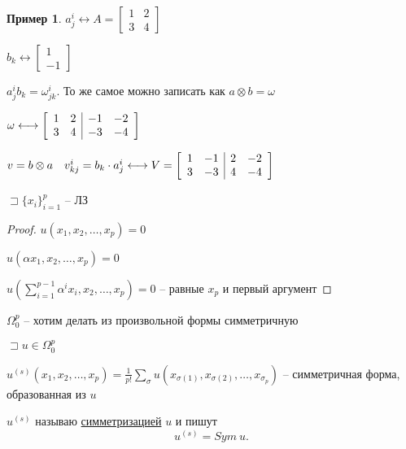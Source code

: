\documentclass{book}
\theoremstyle{definition}
\newtheorem*{example}{Пример}
\begin{document}
         \begin{example}
             $a^i_j \longleftrightarrow A = \begin{bmatrix} 1 & 2\\ 3 & 4 \end{bmatrix} $

             $b_k \longleftrightarrow \begin{bmatrix} 1\\-1 \end{bmatrix} $

             $a^i_jb_k = \omega^i_{jk}$. То же самое можно записать как  $a\otimes b = \omega$

             $\omega \longleftrightarrow \left[
                 \begin{array}{c c | c c}
                     1 & 2 & -1 & -2\\ 3 & 4 & -3 & -4
                \end{array}
             \right]$

             $v = b\otimes a\quad v^i_{kj} = b_k\cdot a^i_j\longleftrightarrow V = \left[
                 \begin{array}{c c | c c}
                    1 & -1 & 2 & -2\\ 3 & -3 & 4 & -4
                \end{array}
             \right]$
        \end{example}



\begin{lemma}
    $\sqsupset \{x_{i} \}_{i=1}^p$ -- ЛЗ
\end{lemma}
\begin{proof}
    $u(x_1, x_2, \ldots, x_p) = 0$

    $u\left( \alpha x_1, x_2, \ldots, x_p \right) = 0 $ 

    $u\left( \sum_{i=1}^{p-1} \alpha^ix_i, x_2, \ldots, x_p \right)  = 0$ -- равные $x_p$ и первый аргумент
\end{proof}

$\Omega_0^p$ -- хотим делать из произвольной формы симметричную

 $\sqsupset u\in \Omega_0^p$

 \begin{definition}
     $u^{(s)}\left( x_1, x_2, \ldots, x_p \right) = \frac{1}{p!}\sum_{\sigma} u\left( x_{\sigma(1)}, x_{\sigma(2)}, \ldots, x_{\sigma_{p}} \right) $ -- симметричная форма, образованная из $u$

     $u^{(s)}$ называю \underline{симметризацией}  $u$ и пишут  \[
         u^{(s)} = Sym~u
     .\] 
 \end{definition}
\end{document}
